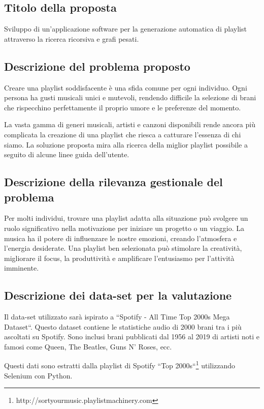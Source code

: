 \documentclass[12pt, a4paper]{article}
\begin{document}
\subsection{Titolo della proposta}

Sviluppo di un'applicazione software per la generazione automatica di playlist attraverso la ricerca ricorsiva e grafi pesati.

\subsection{Descrizione del problema proposto}

Creare una playlist soddisfacente è una sfida comune per ogni individuo. Ogni persona ha gusti musicali unici e mutevoli, rendendo difficile la selezione di brani che rispecchino perfettamente il proprio umore e le preferenze del momento.\par La vasta gamma di generi musicali, artisti e canzoni disponibili rende ancora più complicata la creazione di una playlist che riesca a catturare l'essenza di chi siamo. La soluzione proposta mira alla ricerca della miglior playlist possibile a seguito di alcune linee guida dell’utente.

\subsection{Descrizione della rilevanza gestionale del problema}
Per molti individui, trovare una playlist adatta alla situazione può svolgere un ruolo significativo nella motivazione per iniziare un progetto o un viaggio. La musica ha il potere di influenzare le nostre emozioni, creando l'atmosfera e l'energia desiderate. Una playlist ben selezionata può stimolare la creatività, migliorare il focus, la produttività e amplificare l'entusiasmo per l'attività imminente.

\subsection{Descrizione dei data-set per la valutazione}
Il data-set utilizzato sarà ispirato a “Spotify - All Time Top 2000s Mega Dataset“. Questo dataset contiene le statistiche audio di 2000 brani tra i più ascoltati su Spotify. Sono inclusi brani pubblicati dal 1956 al 2019 di artisti noti e famosi come Queen, The Beatles, Guns N' Roses, ecc. \par Questi dati sono estratti dalla playlist di Spotify “Top 2000s“\footnote{http://sortyourmusic.playlistmachinery.com} utilizzando Selenium con Python.
\newpage
\end{document}
